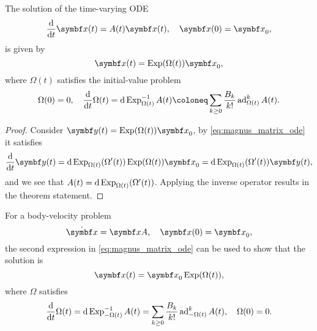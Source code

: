 \begin{important}
  \begin{theorem}
    \label{thm:magnus_solution}
    The solution of the time-varying ODE
    \begin{equation}
      \frac{\mathrm{d}}{\mathrm{d}t} \x(t) = \lx(t) \x(t), \quad \x(0) = \x_0,
    \end{equation}
    is given by
    \begin{equation}
      \x(t) = \Exp(\Omega(t)) \x_0,
    \end{equation}
    where $\Omega(t)$ satisfies the initial-value problem
    \begin{equation}
      \label{eq:magnus_omega_ode}
      \Omega(0) = 0, \quad \frac{\mathrm{d}}{\mathrm{d}t} \Omega(t) = \mathrm{d}\Exp^{-1}_{\Omega(t)} \lx(t) \coloneq \sum_{k \geq 0} \frac{B_k}{k!} \ad_{\Omega(t)}^k A(t).
    \end{equation}
  \end{theorem}
\end{important}
\begin{proof}
  Consider $\y(t) = \Exp (\Omega(t)) \x_0$, by \eqref{eq:magnus_matrix_ode} it satisfies
  \begin{equation}
    \frac{\mathrm{d}}{\mathrm{d}t} \y(t) = \mathrm{d} \Exp_{\Omega(t)}(\Omega'(t)) \Exp(\Omega(t)) \x_0 = \mathrm{d} \Exp_{\Omega(t)}(\Omega'(t)) \y(t),
  \end{equation}
  and we see that $A(t) = \mathrm{d} \operatorname{Exp}_{\Omega(t)}(\Omega'(t))$. Applying the inverse operator results in the theorem statement.
\end{proof}

\begin{remark}
  For a body-velocity problem
  \begin{equation}
    \dot \x = \x \lx, \quad \x(0) = \x_0,
  \end{equation}
  the second expression in \eqref{eq:magnus_matrix_ode} can be used to show that the solution is
  \begin{equation}
    \x(t) = \x_0 \Exp (\Omega(t)),
  \end{equation}
  where $\Omega$ satisfies
  \begin{equation}
    \frac{\mathrm{d}}{\mathrm{d}t}\Omega(t) = \mathrm{d} \operatorname{Exp}^{-1}_{-\Omega(t)} A(t) = \sum_{k \geq 0} \frac{B_k}{k!} \operatorname{ad}_{-\Omega(t)}^k A(t), \quad \Omega(0) = 0.
  \end{equation}
\end{remark}


